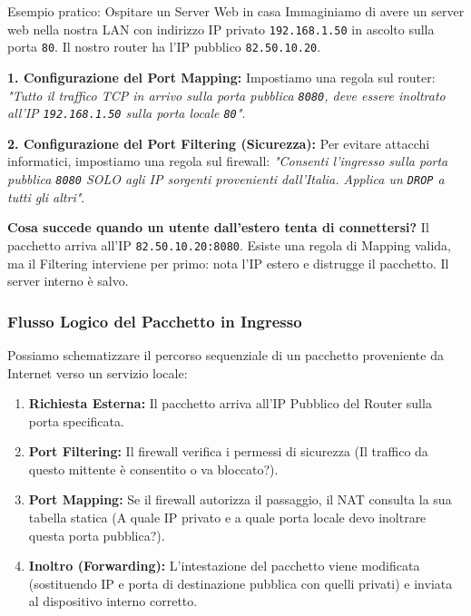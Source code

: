 \documentclass[a4paper,12pt]{report}
\begin{document}
\begin{esempiobox}{Esempio pratico: Ospitare un Server Web in casa}
   Immaginiamo di avere un server web nella nostra LAN con indirizzo IP privato \texttt{192.168.1.50} in ascolto sulla porta \texttt{80}. Il nostro router ha l'IP pubblico \texttt{82.50.10.20}.
  
  \textbf{1. Configurazione del Port Mapping:}
  Impostiamo una regola sul router: \textit{"Tutto il traffico TCP in arrivo sulla porta pubblica \texttt{8080}, deve essere inoltrato all'IP \texttt{192.168.1.50} sulla porta locale \texttt{80}"}.
  
  \textbf{2. Configurazione del Port Filtering (Sicurezza):}
  Per evitare attacchi informatici, impostiamo una regola sul firewall: \textit{"Consenti l'ingresso sulla porta pubblica \texttt{8080} SOLO agli IP sorgenti provenienti dall'Italia. Applica un \texttt{DROP} a tutti gli altri"}.
  
  \textbf{Cosa succede quando un utente dall'estero tenta di connettersi?}
  Il pacchetto arriva all'IP \texttt{82.50.10.20:8080}. Esiste una regola di Mapping valida, ma il Filtering interviene per primo: nota l'IP estero e distrugge il pacchetto. Il server interno è salvo.
\end{esempiobox}

\subsubsection*{Flusso Logico del Pacchetto in Ingresso}

Possiamo schematizzare il percorso sequenziale di un pacchetto proveniente da Internet verso un servizio locale:

\begin{enumerate}
    \item \textbf{Richiesta Esterna:} Il pacchetto arriva all'IP Pubblico del Router sulla porta specificata.
    \item \textbf{Port Filtering:} Il firewall verifica i permessi di sicurezza (Il traffico da questo mittente è consentito o va bloccato?).
    \item \textbf{Port Mapping:} Se il firewall autorizza il passaggio, il NAT consulta la sua tabella statica (A quale IP privato e a quale porta locale devo inoltrare questa porta pubblica?).
    \item \textbf{Inoltro (Forwarding):} L'intestazione del pacchetto viene modificata (sostituendo IP e porta di destinazione pubblica con quelli privati) e inviata al dispositivo interno corretto.
\end{enumerate}
\end{document}
